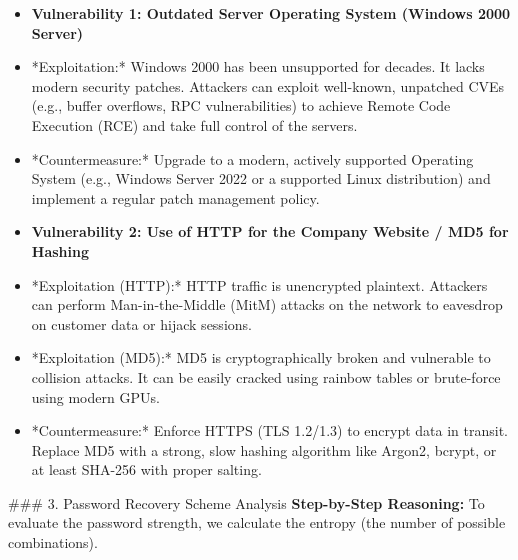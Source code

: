 \documentclass{article}
\begin{document}
\begin{itemize}
    \item \textbf{Vulnerability 1: Outdated Server Operating System (Windows 2000 Server)}
    \item *Exploitation:* Windows 2000 has been unsupported for decades. It lacks modern security patches. Attackers can exploit well-known, unpatched CVEs (e.g., buffer overflows, RPC vulnerabilities) to achieve Remote Code Execution (RCE) and take full control of the servers.
    \item *Countermeasure:* Upgrade to a modern, actively supported Operating System (e.g., Windows Server 2022 or a supported Linux distribution) and implement a regular patch management policy.
    \item \textbf{Vulnerability 2: Use of HTTP for the Company Website / MD5 for Hashing}
    \item *Exploitation (HTTP):* HTTP traffic is unencrypted plaintext. Attackers can perform Man-in-the-Middle (MitM) attacks on the network to eavesdrop on customer data or hijack sessions.
    \item *Exploitation (MD5):* MD5 is cryptographically broken and vulnerable to collision attacks. It can be easily cracked using rainbow tables or brute-force using modern GPUs.
    \item *Countermeasure:* Enforce HTTPS (TLS 1.2/1.3) to encrypt data in transit. Replace MD5 with a strong, slow hashing algorithm like Argon2, bcrypt, or at least SHA-256 with proper salting.

\end{itemize}
\#\#\# 3. Password Recovery Scheme Analysis
\textbf{Step-by-Step Reasoning:}
To evaluate the password strength, we calculate the entropy (the number of possible combinations).
\end{document}

